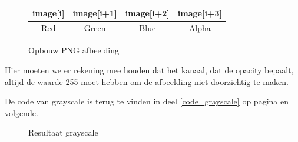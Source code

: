 \documentclass[11pt,twoside,a4paper]{article}
\begin{document}
    \begin{figure}[h!]
        \centering

    \begin{tabular}{|c|c|c|c|}
    \hline
    image{[}i{]} & image{[}i+1{]} & image{[}i+2{]} & image{[}i+3{]} \\ \hline
    Red          & Green          & Blue           & Alpha          \\ \hline
    \end{tabular}

        \caption{Opbouw PNG afbeelding}
        \label{fig:1}
    \end{figure}

    Hier moeten we er rekening mee houden dat het  kanaal, dat de opacity bepaalt, altijd de waarde 255 moet hebben om de afbeelding niet doorzichtig te maken.

    De code van grayscale is terug te vinden in deel \ref{code_grayscale} op pagina \pageref{code_grayscale} en volgende.


\begin{figure}[h!]
    \centering
    \hfill
    \caption{Resultaat grayscale}
    \label{fig:grayscale}
\end{figure}
\end{document}
